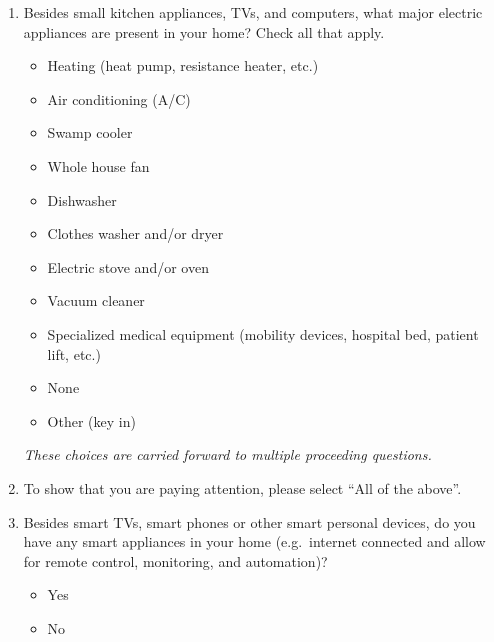 \documentclass{article}
\begin{document}
\begin{enumerate}
\item Besides small kitchen appliances, TVs, and computers, what major electric appliances are present in your home? Check all that apply.
\begin{itemize}
  \item[\checkbox] Heating (heat pump, resistance heater, etc.)
  \item[\checkbox] Air conditioning (A/C)
  \item[\checkbox] Swamp cooler
  \item[\checkbox] Whole house fan
  \item[\checkbox] Dishwasher
  \item[\checkbox] Clothes washer and/or dryer
  \item[\checkbox] Electric stove and/or oven
  \item[\checkbox] Vacuum cleaner
  \item[\checkbox] Specialized medical equipment (mobility devices, hospital bed, patient lift, etc.)
  \item[\checkbox] None
  \item[\checkbox] Other (key in)
\end{itemize}
 
\textit{These choices are carried forward to multiple proceeding questions.}
 

\item To show that you are paying attention, please select ``All of the above''.
 

\item Besides smart TVs, smart phones or other smart personal devices, do you have any smart appliances in your home (e.g.\ internet connected and allow for remote control, monitoring, and automation)?
\begin{itemize}
  \item[\checkbox] Yes
  \item[\checkbox] No
\end{itemize}
 


\end{enumerate}
\end{document}
